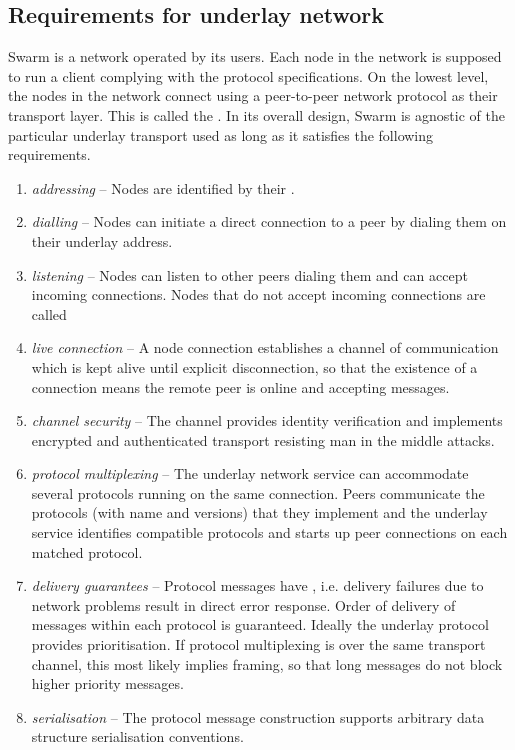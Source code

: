 \subsection{Requirements for underlay network \statusyellow}\label{sec:underlay-transport} 

\yellow{}

Swarm is a network operated by its users. Each node in the network is supposed to run a client complying with the protocol specifications. On the lowest level, the nodes in the network connect using a peer-to-peer network protocol as their transport layer. This is called the . 
In its overall design, Swarm is agnostic of the particular underlay transport used as long as it satisfies the following requirements.

\begin{enumerate}
    \item \emph{addressing} -- Nodes are identified by their .
    \item \emph{dialling} -- Nodes can initiate a direct connection to a peer by dialing them on their underlay address.
    \item \emph{listening} -- Nodes can listen to other peers dialing them and can accept incoming connections. Nodes that do not accept incoming connections are called 
    \item \emph{live connection} -- A node connection establishes a channel of communication which is kept alive until explicit disconnection, so that the existence of a connection means the remote peer is online and accepting messages.
    \item \emph{channel security} -- 
    The channel provides identity verification and implements encrypted and authenticated transport resisting man in the middle attacks.
    \item \emph{protocol multiplexing} -- 
    The underlay network service can accommodate several protocols running on the same connection. Peers communicate the protocols (with name and versions) that they implement and the underlay service identifies compatible protocols and starts up peer connections on each matched protocol. 
    \item \emph{delivery guarantees} -- 
    Protocol messages have , i.e. delivery failures due to network problems result in direct error response. 
    Order of delivery of messages within each protocol is guaranteed. 
    Ideally the underlay protocol provides prioritisation. 
    If protocol multiplexing is over the same transport channel, this most likely implies framing, so that long messages do not block higher priority messages.
    \item \emph{serialisation} -- 
    The protocol message construction supports arbitrary data structure serialisation conventions.
    
\end{enumerate}

